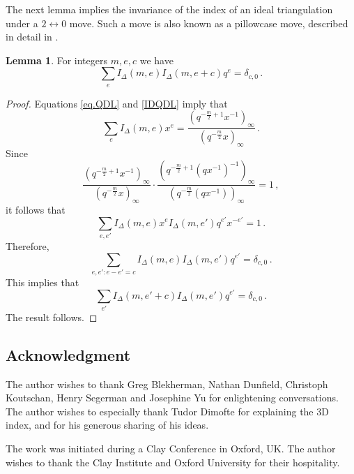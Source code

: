 \documentclass[12pt]{amsart}
\theoremstyle{definition}
\newtheorem{lemma}[theorem]{Lemma}
\def\ID{I_{\Delta}}
\numberwithin{equation}{section}
\begin{document}
The next lemma implies the invariance of the index of an ideal triangulation
under a $2\leftrightarrow 0$ move. Such a move is also known as a pillowcase
move, described in detail in \cite[Sec.6]{GHRS}. 

\begin{lemma}
\label{lem.20move}
For integers $m,e,c$ we have
$$
\sum_e \ID(m,e)\ID(m,e+c) q^e=\delta_{c,0} \,.
$$
\end{lemma}

\begin{proof}
Equations \eqref{eq.QDL} and \eqref{IDQDL} imply that
$$
\sum_e \ID(m,e)x^e = 
\frac{(q^{-\frac{m}{2}+1}x^{-1})_\infty}{
(q^{-\frac{m}{2}}x)_\infty} \,.
$$
Since
$$
\frac{(q^{-\frac{m}{2}+1}x^{-1})_\infty}{
(q^{-\frac{m}{2}}x)_\infty} \cdot
\frac{(q^{-\frac{m}{2}+1}(q x^{-1})^{-1})_\infty}{
(q^{-\frac{m}{2}}(q x^{-1}))_\infty} =1 \,,
$$ 
it follows that 
$$
\sum_{e,e'} \ID(m,e) x^e \ID(m,e') q^{e'} x^{-e'}=1 \,.
$$
Therefore,
$$
\sum_{e,e': e-e'=c} \ID(m,e) \ID(m,e') q^{e'} =\delta_{c,0} \,. 
$$
This implies that
$$
\sum_{e'} \ID(m,e'+c) \ID(m,e') q^{e'}=\delta_{c,0} \,.
$$
The result follows.
\end{proof}

\subsection{Acknowledgment}
The author wishes to thank Greg Blekherman, Nathan Dunfield,
Christoph Koutschan, Henry Segerman and Josephine Yu for enlightening 
conversations. The author wishes to especially thank Tudor Dimofte for 
explaining the 3D index, and for his generous sharing of his ideas. 

The work was initiated during a Clay Conference in Oxford, UK. The author 
wishes to thank the Clay Institute and Oxford University for their hospitality.

\end{document}
